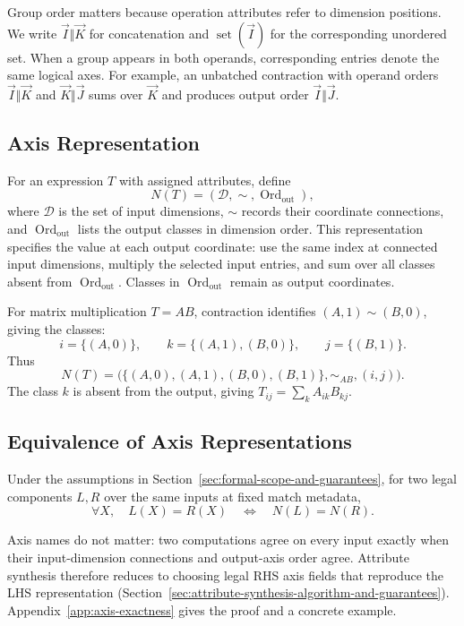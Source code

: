 Group order matters because operation attributes refer to dimension
positions. We write $\vec I\Vert\vec K$ for concatenation and
$\operatorname{set}(\vec I)$ for the corresponding unordered set. When a
group appears in both operands, corresponding entries denote the same
logical axes. For example, an unbatched contraction with operand orders
$\vec I\Vert\vec K$ and $\vec K\Vert\vec J$ sums over $\vec K$ and
produces output order $\vec I\Vert\vec J$.

\subsection{Axis Representation}
\label{sec:axis-representation}
For an expression $T$ with assigned attributes, define
\begin{equation}
 N(T)=(\mathcal D,\sim,\operatorname{Ord}_{\mathrm{out}}),
 \label{eq:axis-representation}
\end{equation}
where $\mathcal D$ is the set of input dimensions, $\sim$ records their coordinate
connections, and $\operatorname{Ord}_{\mathrm{out}}$ lists the output classes in dimension order. This representation
specifies the value at each output coordinate: use the same index at
connected input dimensions, multiply the selected input entries, and sum over
all classes absent from $\operatorname{Ord}_{\mathrm{out}}$. Classes in $\operatorname{Ord}_{\mathrm{out}}$ remain as output coordinates.

For matrix multiplication $T=AB$, contraction identifies
$(A,1)\sim(B,0)$, giving the classes:
\begin{equation}
 i=\{(A,0)\},\qquad k=\{(A,1),(B,0)\},\qquad j=\{(B,1)\}.
\end{equation}
Thus
\begin{equation}
 N(T)=\bigl(\{(A,0),(A,1),(B,0),(B,1)\},\sim_{AB},(i,j)\bigr).
\end{equation}
The class $k$ is absent from the output, giving $T_{ij}=\sum_k A_{ik}B_{kj}$.

\subsection{Equivalence of Axis Representations}
\label{sec:equivalence-of-axis-representations}
\begin{lemma}
\label{lem:axis-exactness}
Under the assumptions in Section~\ref{sec:formal-scope-and-guarantees}, for two legal
components $L,R$ over the same inputs at fixed match metadata,
\begin{equation}
 \forall X,\quad L(X)=R(X)\quad\iff\quad N(L)=N(R).
 \label{eq:axis-exactness}
\end{equation}
\end{lemma}
Axis names do not matter: two computations agree on every input exactly when
their input-dimension connections and output-axis order agree. Attribute
synthesis therefore reduces to choosing legal RHS axis fields that reproduce
the LHS representation (Section~\ref{sec:attribute-synthesis-algorithm-and-guarantees}).
Appendix~\ref{app:axis-exactness} gives the proof and a concrete example.
